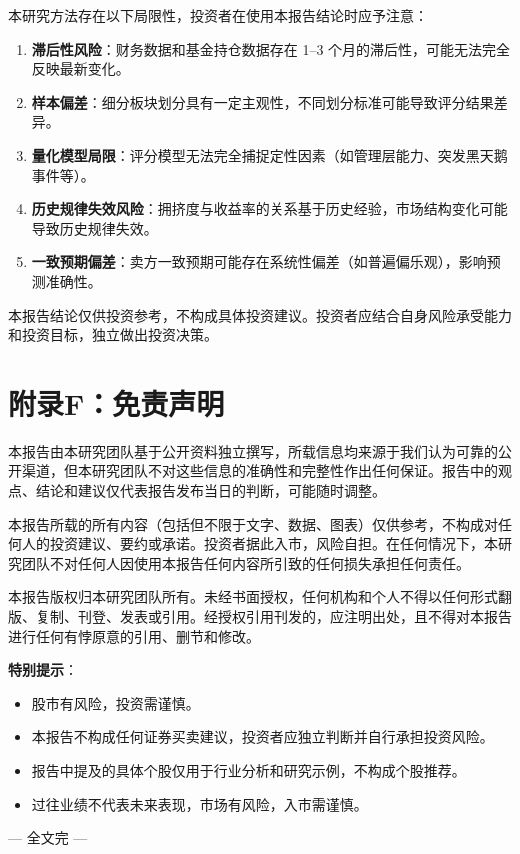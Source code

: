 本研究方法存在以下局限性，投资者在使用本报告结论时应予注意：

\begin{enumerate}[leftmargin=2em]
\item \textbf{滞后性风险}：财务数据和基金持仓数据存在 1--3 个月的滞后性，可能无法完全反映最新变化。
\item \textbf{样本偏差}：细分板块划分具有一定主观性，不同划分标准可能导致评分结果差异。
\item \textbf{量化模型局限}：评分模型无法完全捕捉定性因素（如管理层能力、突发黑天鹅事件等）。
\item \textbf{历史规律失效风险}：拥挤度与收益率的关系基于历史经验，市场结构变化可能导致历史规律失效。
\item \textbf{一致预期偏差}：卖方一致预期可能存在系统性偏差（如普遍偏乐观），影响预测准确性。
\end{enumerate}

本报告结论仅供投资参考，不构成具体投资建议。投资者应结合自身风险承受能力和投资目标，独立做出投资决策。

\section{附录F：免责声明}

\begin{disclosurebox}[免责声明]
\small

本报告由本研究团队基于公开资料独立撰写，所载信息均来源于我们认为可靠的公开渠道，但本研究团队不对这些信息的准确性和完整性作出任何保证。报告中的观点、结论和建议仅代表报告发布当日的判断，可能随时调整。

\vspace{0.3em}

本报告所载的所有内容（包括但不限于文字、数据、图表）仅供参考，不构成对任何人的投资建议、要约或承诺。投资者据此入市，风险自担。在任何情况下，本研究团队不对任何人因使用本报告任何内容所引致的任何损失承担任何责任。

\vspace{0.3em}

本报告版权归本研究团队所有。未经书面授权，任何机构和个人不得以任何形式翻版、复制、刊登、发表或引用。经授权引用刊发的，应注明出处，且不得对本报告进行任何有悖原意的引用、删节和修改。

\vspace{0.3em}

\textbf{特别提示}：
\begin{itemize}[leftmargin=2em]
\item 股市有风险，投资需谨慎。
\item 本报告不构成任何证券买卖建议，投资者应独立判断并自行承担投资风险。
\item 报告中提及的具体个股仅用于行业分析和研究示例，不构成个股推荐。
\item 过往业绩不代表未来表现，市场有风险，入市需谨慎。
\end{itemize}

\vspace{0.3em}

\begin{center}\kaishu --- 全文完 ---\end{center}

\end{disclosurebox}
